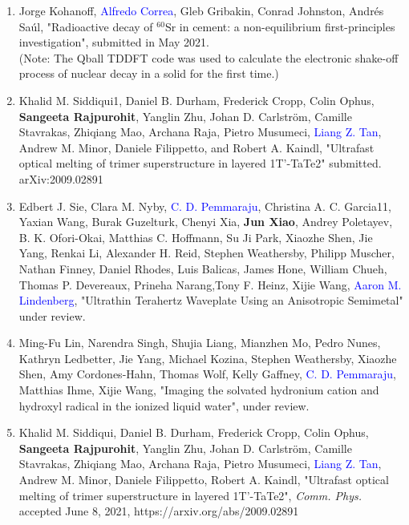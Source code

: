 \begin{enumerate}
    \item Jorge Kohanoff, \textcolor{blue}{Alfredo Correa}, Gleb Gribakin, Conrad Johnston, Andr\'{e}s Sa\'{u}l, "Radioactive decay of $^{60}$Sr in cement: a non-equilibrium first-principles investigation", submitted in May 2021.\\
    (Note: The Qball TDDFT code was used to calculate the electronic shake-off process of nuclear decay in a solid for the first time.)

    \item Khalid M. Siddiqui1, Daniel B. Durham, Frederick Cropp, Colin Ophus, {\bf Sangeeta Rajpurohit}, Yanglin Zhu, Johan D. Carlstr\"{o}m, Camille Stavrakas, Zhiqiang Mao, Archana Raja, Pietro Musumeci, \textcolor{blue}{Liang Z. Tan}, Andrew M. Minor, Daniele Filippetto, and Robert A. Kaindl, "Ultrafast optical melting of trimer superstructure in layered 1T’-TaTe2" submitted.  arXiv:2009.02891

    \item Edbert J. Sie, Clara M. Nyby, \textcolor{blue}{C. D. Pemmaraju}, Christina A. C. Garcia11, Yaxian Wang, Burak Guzelturk, Chenyi Xia, {\bf Jun Xiao}, Andrey Poletayev, B. K. Ofori-Okai, Matthias C. Hoffmann, Su Ji Park, Xiaozhe Shen, Jie Yang, Renkai Li, Alexander H. Reid, Stephen Weathersby, Philipp Muscher, Nathan Finney, Daniel Rhodes, Luis Balicas, James Hone, William Chueh, Thomas P. Devereaux, Prineha Narang,Tony F. Heinz, Xijie Wang, \textcolor{blue}{Aaron M. Lindenberg}, "Ultrathin Terahertz Waveplate Using an Anisotropic Semimetal" under review.
    
    \item Ming-Fu Lin, Narendra Singh, Shujia Liang, Mianzhen Mo, Pedro Nunes, Kathryn Ledbetter, Jie Yang, Michael Kozina, Stephen Weathersby, Xiaozhe Shen, Amy Cordones-Hahn, Thomas Wolf, Kelly Gaffney, \textcolor{blue}{C. D. Pemmaraju}, Matthias Ihme, Xijie Wang, "Imaging the solvated hydronium cation and hydroxyl radical in the ionized liquid water", under review.

    \item Khalid M. Siddiqui, Daniel B. Durham, Frederick Cropp, Colin Ophus, {\bf Sangeeta Rajpurohit}, Yanglin Zhu, Johan D. Carlström, Camille Stavrakas, Zhiqiang Mao, Archana Raja, Pietro Musumeci, \textcolor{blue}{Liang Z. Tan}, Andrew M. Minor, Daniele Filippetto, Robert A. Kaindl, "Ultrafast optical melting of trimer superstructure in layered 1T'-TaTe2", {\it Comm. Phys.} accepted June 8, 2021, https://arxiv.org/abs/2009.02891 


\end{enumerate}
